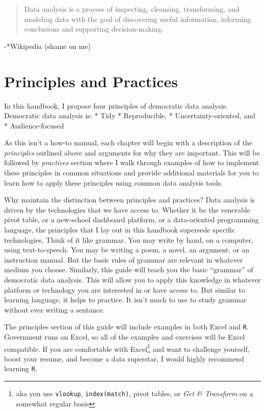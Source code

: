 \documentclass[]{book}
\begin{document}
\begin{quote}
Data analysis is a process of inspecting, cleansing, transforming, and modeling data with the goal of discovering useful information, informing conclusions and supporting decision-making.
\end{quote}

-*Wikipedia (shame on me)

\hypertarget{principles-and-practices}{%
\section{Principles and Practices}\label{principles-and-practices}}

In this handbook, I propose four principles of democratic data analysis. Democratic data analysis is:
* Tidy
* Reproducible,
* Uncertainty-oriented, and
* Audience-focused

As this isn't a how-to manual, each chapter will begin with a description of the \emph{principles} outlined above and arguments for why they are important. This will be followed by \emph{practices} section where I walk through examples of how to implement these principles in common situations and provide additional materials for you to learn how to apply these principles using common data analysis tools.

Why maintain the distinction between principles and practices? Data analysis is driven by the technologies that we have access to. Whether it be the venerable pivot table, or a new-school dashboard platform, or a data-oriented programming language, the principles that I lay out in this handbook supersede specific technologies. Think of it like grammar. You may write by hand, on a computer, using text-to-speech. You may be writing a poem, a novel, an argument, or an instruction manual. But the basic rules of grammar are relevant in whatever medium you choose. Similarly, this guide will teach you the basic ``grammar'' of democratic data analysis. This will allow you to apply this knowledge in whatever platform or technology you are interested in or have access to. But similar to learning language, it helps to practice. It isn't much to use to study grammar without ever writing a sentance.

The principles section of this guide will include examples in both Excel and \texttt{R}. Government runs on Excel, so all of the examples and exercises will be Excel compatible. If you are comfortable with Excel\footnote{aka you use \texttt{vlookup}, \texttt{index(match)}, pivot tables, or \emph{Get \& Transform} on a somewhat regular basis} and want to challenge yourself, boost your resume, and become a data superstar, I would highly recommend learning \texttt{R}.
\end{document}
